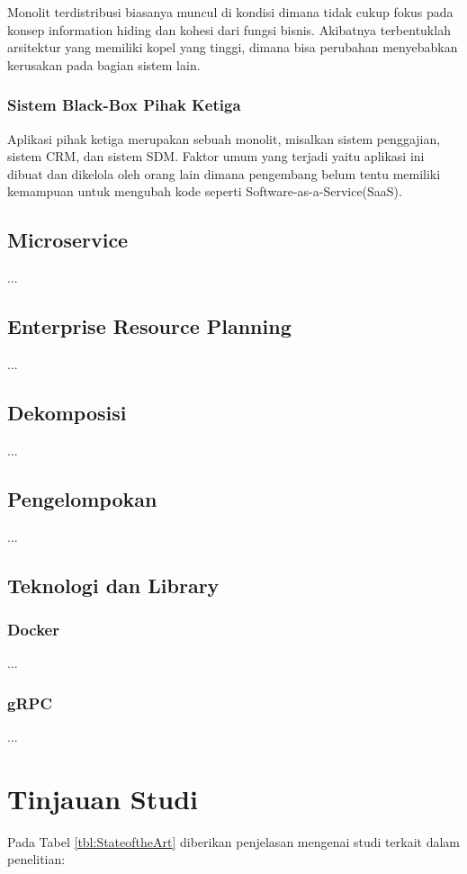 Monolit terdistribusi biasanya muncul  di kondisi dimana tidak cukup fokus pada konsep information hiding dan kohesi dari fungsi bisnis. Akibatnya terbentuklah arsitektur yang memiliki kopel yang tinggi, dimana bisa perubahan menyebabkan kerusakan pada bagian sistem lain\cite{6}.\\ 
\subsubsection{Sistem Black-Box Pihak Ketiga}
Aplikasi pihak ketiga merupakan sebuah monolit, misalkan sistem penggajian, sistem CRM, dan sistem SDM. Faktor umum yang terjadi yaitu aplikasi ini dibuat dan dikelola oleh orang lain dimana pengembang belum tentu memiliki kemampuan untuk mengubah kode seperti Software-as-a-Service(SaaS)\cite{6}.\\

\subsection{Microservice}
...
\subsection{Enterprise Resource Planning}
...
\subsection{Dekomposisi}
...
\subsection{Pengelompokan}
...
\subsection{Teknologi dan Library}
\subsubsection{Docker}
...
\subsubsection{gRPC}
...

\section{Tinjauan Studi}
\par Pada Tabel \ref{tbl:StateoftheArt} diberikan penjelasan mengenai studi terkait dalam penelitian:

